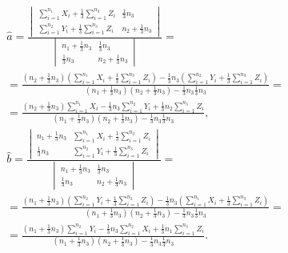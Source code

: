 \begin{multline}
    \widehat{a}
    =
    \frac{
        \begin{vmatrix}
            \sum_{i=1}^{n_1} X_i + \frac{1}{3} \sum_{i=1}^{n_3} Z_i & \frac{1}{3} n_3       \\
            \sum_{i=1}^{n_2} Y_i + \frac{1}{3} \sum_{i=1}^{n_3} Z_i & n_2 + \frac{1}{3} n_3
        \end{vmatrix}
    }
    {
        \begin{vmatrix}
            n_1 + \frac{1}{3} n_3 & \frac{1}{3} n_3       \\
            \frac{1}{3} n_3       & n_2 + \frac{1}{3} n_3
        \end{vmatrix}
    } = \\
    = \frac{
        \left ( n_2 + \frac{1}{3} n_3 \right ) \left ( \sum_{i=1}^{n_1} X_i + \frac{1}{3} \sum_{i=1}^{n_3} Z_i \right ) - \frac{1}{3} n_3 \left ( \sum_{i=1}^{n_2} Y_i + \frac{1}{3} \sum_{i=1}^{n_3} Z_i \right )
    }
    {
        \left ( n_1 + \frac{1}{3} n_3 \right ) \left ( n_2 + \frac{1}{3} n_3 \right ) - \frac{1}{3} n_3 \frac{1}{3} n_3
    }
    = \\
    = \frac{
        \left ( n_2 + \frac{1}{3} n_3 \right ) \sum_{i=1}^{n_1} X_i - \frac{1}{3} n_3 \sum_{i=1}^{n_2} Y_i + \frac{1}{3} n_2 \sum_{i=1}^{n_3} Z_i
    }
    {
        \left ( n_1 + \frac{1}{3} n_3 \right ) \left ( n_2 + \frac{1}{3} n_3 \right ) - \frac{1}{3} n_3 \frac{1}{3} n_3
    } ,
\end{multline}
\begin{multline}
    \widehat{b}
    = \frac{
        \begin{vmatrix}
            n_1 + \frac{1}{3} n_3 & \sum_{i=1}^{n_1} X_i + \frac{1}{3} \sum_{i=1}^{n_3} Z_i \\
            \frac{1}{3} n_3       & \sum_{i=1}^{n_2} Y_i + \frac{1}{3} \sum_{i=1}^{n_3} Z_i
        \end{vmatrix}
    }
    {
        \begin{vmatrix}
            n_1 + \frac{1}{3} n_3 & \frac{1}{3} n_3       \\
            \frac{1}{3} n_3       & n_2 + \frac{1}{3} n_3
        \end{vmatrix}
    } = \\
    = \frac{
        \left ( n_1 + \frac{1}{3} n_3 \right ) \left ( \sum_{i=1}^{n_2} Y_i + \frac{1}{3} \sum_{i=1}^{n_3} Z_i \right ) - \frac{1}{3} n_3 \left ( \sum_{i=1}^{n_1} X_i + \frac{1}{3} \sum_{i=1}^{n_3} Z_i \right )
    }
    {
        \left ( n_1 + \frac{1}{3} n_3 \right ) \left ( n_2 + \frac{1}{3} n_3 \right ) - \frac{1}{3} n_3 \frac{1}{3} n_3
    }
    = \\
    = \frac{
        \left ( n_1 + \frac{1}{3} n_3 \right ) \sum_{i=1}^{n_2} Y_i - \frac{1}{3} n_3 \sum_{i=1}^{n_2} X_i + \frac{1}{3} n_1 \sum_{i=1}^{n_3} Z_i
    }
    {
        \left ( n_1 + \frac{1}{3} n_3 \right ) \left ( n_2 + \frac{1}{3} n_3 \right ) - \frac{1}{3} n_3 \frac{1}{3} n_3
    } .
\end{multline}

